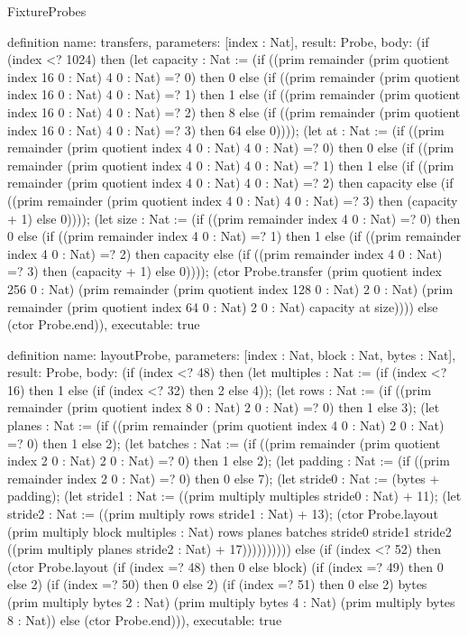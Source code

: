 \begin{lexlean}{FixtureProbes}
\begin{semanticmodule}
definition{
  name: transfers,
  parameters: [index : Nat],
  result: Probe,
  body: (if (index <? 1024) then (let capacity : Nat := (if ((prim remainder (prim quotient index 16 0 : Nat) 4 0 : Nat) =? 0) then 0 else (if ((prim remainder (prim quotient index 16 0 : Nat) 4 0 : Nat) =? 1) then 1 else (if ((prim remainder (prim quotient index 16 0 : Nat) 4 0 : Nat) =? 2) then 8 else (if ((prim remainder (prim quotient index 16 0 : Nat) 4 0 : Nat) =? 3) then 64 else 0)))); (let at : Nat := (if ((prim remainder (prim quotient index 4 0 : Nat) 4 0 : Nat) =? 0) then 0 else (if ((prim remainder (prim quotient index 4 0 : Nat) 4 0 : Nat) =? 1) then 1 else (if ((prim remainder (prim quotient index 4 0 : Nat) 4 0 : Nat) =? 2) then capacity else (if ((prim remainder (prim quotient index 4 0 : Nat) 4 0 : Nat) =? 3) then (capacity + 1) else 0)))); (let size : Nat := (if ((prim remainder index 4 0 : Nat) =? 0) then 0 else (if ((prim remainder index 4 0 : Nat) =? 1) then 1 else (if ((prim remainder index 4 0 : Nat) =? 2) then capacity else (if ((prim remainder index 4 0 : Nat) =? 3) then (capacity + 1) else 0)))); (ctor Probe.transfer (prim quotient index 256 0 : Nat) (prim remainder (prim quotient index 128 0 : Nat) 2 0 : Nat) (prim remainder (prim quotient index 64 0 : Nat) 2 0 : Nat) capacity at size)))) else (ctor Probe.end)),
  executable: true
}

definition{
  name: layoutProbe,
  parameters: [index : Nat, block : Nat, bytes : Nat],
  result: Probe,
  body: (if (index <? 48) then (let multiples : Nat := (if (index <? 16) then 1 else (if (index <? 32) then 2 else 4)); (let rows : Nat := (if ((prim remainder (prim quotient index 8 0 : Nat) 2 0 : Nat) =? 0) then 1 else 3); (let planes : Nat := (if ((prim remainder (prim quotient index 4 0 : Nat) 2 0 : Nat) =? 0) then 1 else 2); (let batches : Nat := (if ((prim remainder (prim quotient index 2 0 : Nat) 2 0 : Nat) =? 0) then 1 else 2); (let padding : Nat := (if ((prim remainder index 2 0 : Nat) =? 0) then 0 else 7); (let stride0 : Nat := (bytes + padding); (let stride1 : Nat := ((prim multiply multiples stride0 : Nat) + 11); (let stride2 : Nat := ((prim multiply rows stride1 : Nat) + 13); (ctor Probe.layout (prim multiply block multiples : Nat) rows planes batches stride0 stride1 stride2 ((prim multiply planes stride2 : Nat) + 17)))))))))) else (if (index <? 52) then (ctor Probe.layout (if (index =? 48) then 0 else block) (if (index =? 49) then 0 else 2) (if (index =? 50) then 0 else 2) (if (index =? 51) then 0 else 2) bytes (prim multiply bytes 2 : Nat) (prim multiply bytes 4 : Nat) (prim multiply bytes 8 : Nat)) else (ctor Probe.end))),
  executable: true
}


\end{semanticmodule}
\end{lexlean}
